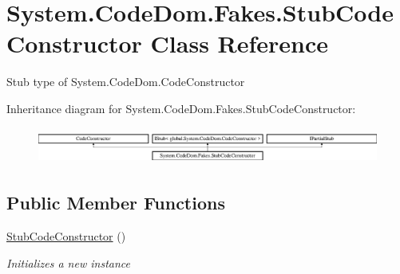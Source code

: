 \hypertarget{class_system_1_1_code_dom_1_1_fakes_1_1_stub_code_constructor}{\section{System.\-Code\-Dom.\-Fakes.\-Stub\-Code\-Constructor Class Reference}
\label{class_system_1_1_code_dom_1_1_fakes_1_1_stub_code_constructor}
}


Stub type of System.\-Code\-Dom.\-Code\-Constructor 


Inheritance diagram for System.\-Code\-Dom.\-Fakes.\-Stub\-Code\-Constructor\-:\begin{figure}[H]
\begin{center}
\leavevmode
\includegraphics[height=1.208199cm]{class_system_1_1_code_dom_1_1_fakes_1_1_stub_code_constructor}
\end{center}
\end{figure}
\subsection*{Public Member Functions}
\begin{DoxyCompactItemize}
\item 
\hyperlink{class_system_1_1_code_dom_1_1_fakes_1_1_stub_code_constructor_a8170c5587b6440d657821d38c6f091db}{Stub\-Code\-Constructor} ()
\begin{DoxyCompactList}\small\item\em Initializes a new instance\end{DoxyCompactList}\end{DoxyCompactItemize}
